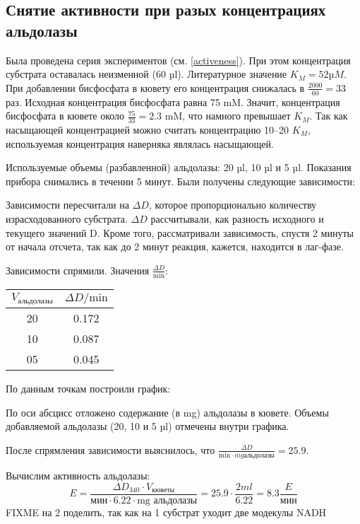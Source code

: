 \subsection{Снятие активности при разых концентрациях альдолазы}
Была проведена серия экспериментов (см. \ref{activeness}).
При этом концентрация субстрата оставалась неизменной (60 µl).
Литературное значение $K_M = 52 µM$.
При добавлении бисфосфата в кювету его концентрация снижалась в $\frac{2000}{60} = 33$ раз.
Исходная концентрация бисфосфата равна 75 mM.
Значит, концентрация бисфосфата в кювете около $\frac{75}{33} = 2.3$ mM,
что намного превышает $K_M$.
Так как насыщающей концентрацией можно считать концентрацию 10--20 $K_M$,
используемая концентрация наверняка являлась насыщающей.

Используемые объемы (разбавленной) альдолазы: 20 µl, 10 µl и 5 µl.
Показания прибора снимались в течении 5 минут.
Были получены следующие зависимости:



Зависимости пересчитали на $\Delta D$, которое пропорционально количеству израсходованного субстрата.
$\Delta D$ рассчитывали, как разность исходного и текущего значений D.
Кроме того, рассматривали зависимость, спустя 2 минуты от начала отсчета,
так как до 2 минут реакция, кажется, находится в лаг-фазе.



Зависимости спрямили. Значения $\frac{\Delta D}{\text{min}}$:

\begin{tabular}{|c|c|}
\hline
$ V_{\text{альдолазы}} $ & $ \Delta D / \text{min} $ \\
\hline
20 & 0.172 \\
10 & 0.087 \\
05 & 0.045 \\
\hline
\end{tabular}

По данным точкам построили график:



По оси абсцисс отложено содержание (в mg) альдолазы в кювете.
Объемы добавляемой альдолазы (20, 10 и 5 µl) отмечены внутри графика.

После спрямления зависимости выяснилось, что
$\frac{\Delta D}{\text{min} \cdot {mg альдолазы}} = 25.9$.

Вычислим активность альдолазы:
$$ E = \frac{\Delta D_{340} \cdot V_{кюветы}}{\text{мин} \cdot 6.22 \cdot \text{mg альдолазы}} =
    25.9 \cdot \frac{2 ml}{6.22} = 8.3 \frac{E}{\text{мин}}$$
FIXME на 2 поделить, так как на 1 субстрат уходит две модекулы NADH


